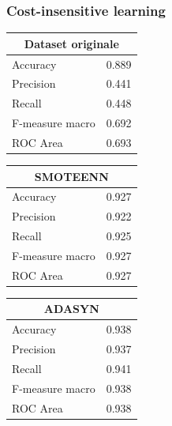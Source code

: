 \documentclass[italian,12pt,a4paper]{article}
\begin{document}
	\subsubsection{Cost-insensitive learning}

	
	\begin{center}
	
	   \begin{table}[h]
		\footnotesize
		\begin{tabular}{|p{2cm}|c|}
			\hline
			\multicolumn{2}{|c|}{Dataset originale}\\ \hline
				Accuracy & 0.889 \\ \hline
				Precision & 0.441 \\ \hline
				Recall & 0.448 \\ \hline
				F-measure macro & 0.692 \\ \hline
				ROC Area & 0.693 \\ \hline
		\end{tabular}
		\hfill
		\begin{tabular}{|p{2cm}|c|}
			\hline
			\multicolumn{2}{|c|}{SMOTEENN}\\ \hline
				Accuracy & 0.927 \\ \hline
				Precision & 0.922 \\ \hline
				Recall & 0.925 \\ \hline
				F-measure macro & 0.927 \\ \hline
				ROC Area & 0.927 \\ \hline  
		\end{tabular}
		\hfill
		\begin{tabular}{|p{2cm}|r|} \hline
			\multicolumn{2}{|c|}{ADASYN}\\ \hline
				Accuracy & 0.938 \\ \hline
				Precision & 0.937 \\ \hline
				Recall & 0.941 \\ \hline
				F-measure macro & 0.938 \\ \hline
				ROC Area & 0.938 \\ \hline  
		\end{tabular}
	\end{table}
	

\end{center}
\end{document}
